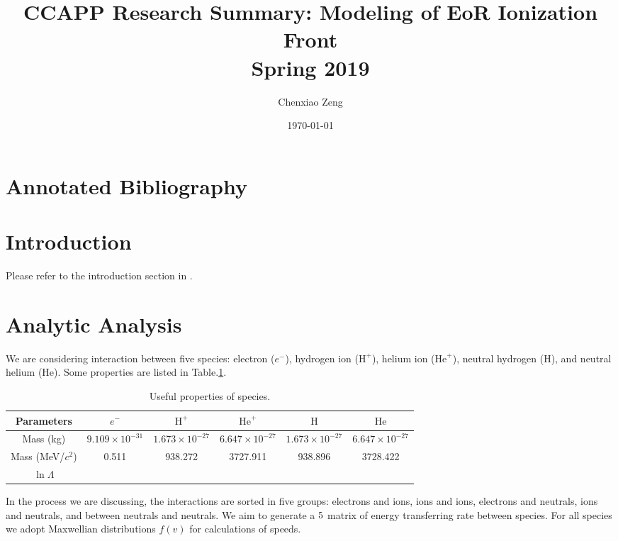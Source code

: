 \documentclass{article}
\author{Chenxiao Zeng}
\date{\today}
\title{\textbf{CCAPP Research Summary: Modeling of EoR Ionization Front}\\\vspace{20pt}Spring 2019}
\begin{document}
	
\maketitle
\tableofcontents

\section{Annotated Bibliography}

\section{Introduction}
Please refer to the introduction section in \cite{Hirata:2018ss}.
\section{Analytic Analysis}
We are considering interaction between five species: electron ($e^-$), hydrogen ion ($\text{H}^+$), helium ion ($\text{He}^+$), neutral hydrogen ($\text{H}$), and neutral helium ($\text{He}$).
Some properties are listed in Table.\ref{species_properties}.

\begin{table}[ht]
\begin{center}
\caption{Useful properties of species.}
\label{species_properties}
\begin{tabular}{cccccc} \hline \hline
\multicolumn{1}{c}{Parameters}&  \multicolumn{1}{c}{$e^-$} & \multicolumn{1}{c}{$\text{H}^+$} & \multicolumn{1}{c}{$\text{He}^+$} & \multicolumn{1}{c}{$\text{H}$} & \multicolumn{1}{c}{$\text{He}$}\\
\hline
Mass (kg) & $9.109 \times 10^{-31}$ & $1.673 \times 10^{-27}$ & $6.647 \times 10^{-27}$  & $1.673 \times 10^{-27}$ & $6.647 \times 10^{-27}$ \\
Mass (MeV/$c^2$) & 0.511 & 938.272 & 3727.911 & 938.896 & 3728.422\\
$\ln \Lambda$ &  &  &  &  & \\
\hline \hline
\end{tabular}
\end{center}
\end{table}

In the process we are discussing, the interactions are sorted in five groups: electrons and ions, ions and ions, electrons and neutrals, ions and neutrals, and between neutrals and neutrals. We aim to generate a $5\time5$ matrix of energy transferring rate between species. For all species we adopt Maxwellian distributions $f(v)$ for calculations of speeds.
\end{document}
